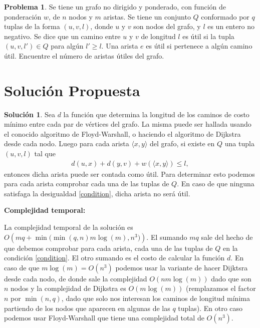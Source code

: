 \documentclass[10pt]{amsart}
\theoremstyle{definition}
\newtheorem{sol}[theorem]{Soluci\'on}
\newtheorem{prob}[theorem]{Problema}
\numberwithin{equation}{section}
\newcommand{\edge}[1]{\langle #1\rangle}
\begin{document}
	\begin{prob}
		Se tiene un grafo no dirigido y ponderado, con funci\'on de ponderaci\'on $w$, de $n$ nodos y $m$ aristas. Se tiene un conjunto $Q$ conformado por $q$ tuplas de la forma $(u,v,l)$, donde $u$ y $v$ son nodos del grafo, y $l$ es un entero no negativo. Se dice que un camino entre $u$ y $v$ de longitud $l$ es \'util si la tupla $(u,v,l') \in Q$ para alg\'un $l' \ge l$. Una arista $e$ es \'util si pertenece a alg\'un camino \'util. Encuentre el n\'umero de aristas \'utiles del grafo.
	\end{prob}

\section{Soluci\'on Propuesta}
	
	\begin{sol}\label{sol_optima_travel} Sea $d$ la funci\'on que determina la longitud de los caminos de costo m\'inimo entre cada par de v\'ertices del grafo. La misma puede ser hallada usando el conocido algoritmo de Floyd-Warshall, o haciendo el algoritmo de Dijkstra desde cada nodo. Luego para cada arista $\edge{x,y}$ del grafo, si existe en $Q$ una tupla $(u,v,l)$ tal que
	\begin{align}\label{condition}
		d(u,x) + d(y,v) + w \left(\edge{x, y} \right) \le l,
	\end{align}
	entonces dicha arista puede ser contada como \'util. Para determinar esto podemos para cada arista comprobar cada una de las tuplas de $Q$. En caso de que ninguna satisfaga la desigualdad \eqref{condition}, dicha arista no ser\'a \'util.
	\end{sol}

\textbf{Complejidad temporal:}

 La complejidad temporal de la soluci\'on es $O\left(mq + \min\big(\min(q,n) m\log(m), n^3\big) \right)$. El sumando $mq$ sale del hecho de que debemos comprobar para cada arista, cada una de las tuplas de $Q$ en la condici\'on \eqref{condition}. El otro sumando es el costo de calcular la funci\'on $d$. En caso de que $m \log(m) = O(n^3)$ podemos usar la variante de hacer Dijktsra desde cada nodo, de donde sale la complejidad $O(nm\log(m))$ dado que son $n$ nodos y la complejidad de Dijkstra es $O(m\log(m))$ (remplazamos el factor $n$ por $\min(n, q)$, dado que solo nos interesan los caminos de longitud m\'inima partiendo de los nodos que aparecen en algunas de las $q$ tuplas). En otro caso podemos usar Floyd-Warshall que tiene una complejidad total de $O(n^3)$.
\end{document}
